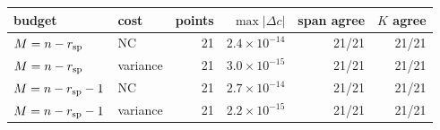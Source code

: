 \begin{tabular}{llrrrr}
\hline
budget & cost & points & $\max|\Delta c|$ & span agree & $K$ agree\\
\hline
$M=n-r_{\mathrm{sp}}$ & NC & 21 & $2.4\times10^{-14}$ & 21/21 & 21/21\\
$M=n-r_{\mathrm{sp}}$ & variance & 21 & $3.0\times10^{-15}$ & 21/21 & 21/21\\
$M=n-r_{\mathrm{sp}}-1$ & NC & 21 & $2.7\times10^{-14}$ & 21/21 & 21/21\\
$M=n-r_{\mathrm{sp}}-1$ & variance & 21 & $2.2\times10^{-15}$ & 21/21 & 21/21\\
\hline
\end{tabular}
